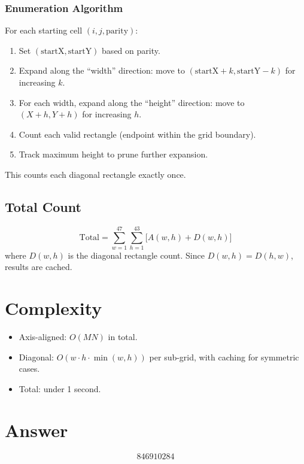 \documentclass[12pt]{article}
\begin{document}
\subsubsection{Enumeration Algorithm}
For each starting cell $(i, j, \text{parity})$:
\begin{enumerate}
    \item Set $(\text{startX}, \text{startY})$ based on parity.
    \item Expand along the ``width'' direction: move to $(\text{startX}+k, \text{startY}-k)$ for increasing $k$.
    \item For each width, expand along the ``height'' direction: move to $(X+h, Y+h)$ for increasing $h$.
    \item Count each valid rectangle (endpoint within the grid boundary).
    \item Track maximum height to prune further expansion.
\end{enumerate}

This counts each diagonal rectangle exactly once.

\subsection{Total Count}
\[
\text{Total} = \sum_{w=1}^{47} \sum_{h=1}^{43} \bigl[ A(w,h) + D(w,h) \bigr]
\]
where $D(w,h)$ is the diagonal rectangle count. Since $D(w,h) = D(h,w)$, results are cached.

\section{Complexity}
\begin{itemize}
    \item Axis-aligned: $O(MN)$ in total.
    \item Diagonal: $O(w \cdot h \cdot \min(w,h))$ per sub-grid, with caching for symmetric cases.
    \item Total: under 1 second.
\end{itemize}

\section{Answer}

\[
\boxed{846910284}
\]
\end{document}
